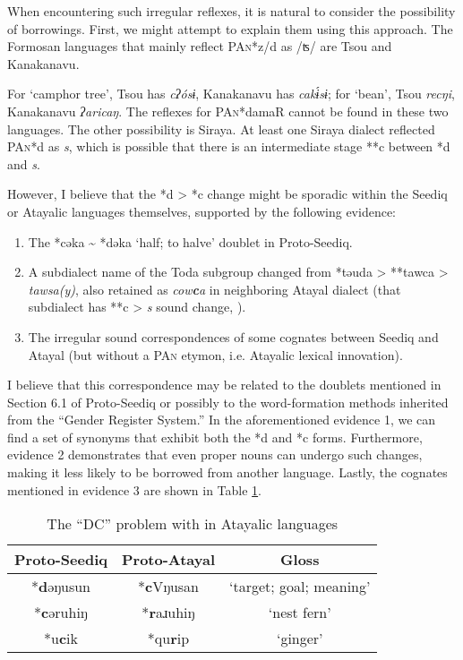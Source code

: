 \documentclass[12pt]{article}
\newcommand{\pan}{\textsc{PAn}\xspace}
\newcommand{\psedf}{Proto-Seediq\xspace}
\begin{document}
When encountering such irregular reflexes, it is natural to consider the possibility of borrowings. First, we might attempt to explain them using this approach. The Formosan languages that mainly reflect \pan *z/d as /ʦ/ are Tsou and Kanakanavu. 

For `camphor tree', Tsou has \textit{cʔósɨ}, Kanakanavu has \textit{cakɨ́sɨ}; for `bean', Tsou \textit{recŋi}, Kanakanavu \textit{ʔaricaŋ}. The reflexes for \pan *damaR cannot be found in these two languages. The other possibility is Siraya. At least one Siraya dialect reflected \pan *d as \textit{s}, which is possible that there is an intermediate stage **c between *d and \textit{s}.

However, I believe that the *d > *c change might be sporadic within the Seediq or Atayalic languages themselves, supported by the following evidence:

\begin{enumerate}
\setlength\itemsep{0em}
    \item The *cəka \~{} *dəka `half; to halve' doublet in \psedf. 
    \item A subdialect name of the Toda subgroup changed from *təuda > **tawca > \textit{tawsa(y)}, also retained as \textit{cow\textbf{c}a} in neighboring Atayal dialect (that subdialect has **c > \textit{s} sound change, \cite{lee2012tawsa}).
    \item  The irregular sound correspondences of some cognates between Seediq and Atayal (but without a \pan etymon, i.e. Atayalic lexical innovation).
\end{enumerate}

I believe that this correspondence may be related to the doublets mentioned in Section 6.1 of \psedf or possibly to the word-formation methods inherited from the ``Gender Register System.'' In the aforementioned evidence 1, we can find a set of synonyms that exhibit both the *d and *c forms. Furthermore, evidence 2 demonstrates that even proper nouns can undergo such changes, making it less likely to be borrowed from another language. Lastly, the cognates mentioned in evidence 3 are shown in Table \ref{tab:dc2}.

\begin{table}[!htbp]
\centering
\caption{The ``DC'' problem with in Atayalic languages}
\label{tab:dc2}
\begin{tabular}{ccc}
\hline
\psedf   & Proto-Atayal & Gloss                   \\ \hline
*\textbf{d}əŋusun & *\textbf{c}Vŋusan     & `target; goal; meaning' \\
*\textbf{c}əruhiŋ & *\textbf{r}aɹuhiŋ     & `nest fern'             \\
*u\textbf{c}ik    & *qu\textbf{r}ip       & `ginger'                \\ \hline
\end{tabular}
\end{table}
\end{document}
